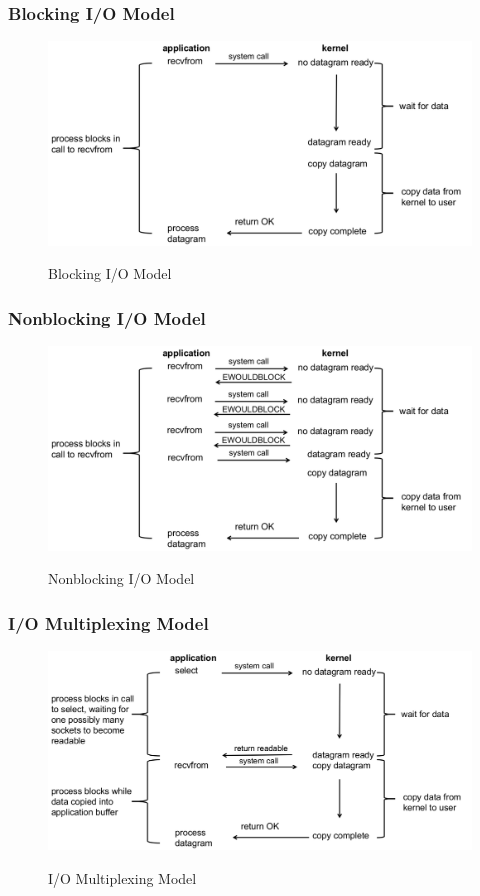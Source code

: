 \documentclass[notes,serif]{beamer}
\begin{document}
\begin{frame}
\frametitle{Blocking I/O Model}
  \begin{figure}
  \centering
  \includegraphics[width=.8\textwidth]{fig/03fig01.png}\\
  \caption{Blocking I/O Model}
  \label{1}
  \end{figure}
\end{frame}

\begin{frame}
\frametitle{Nonblocking I/O Model}
  \begin{figure}
  \centering
  \includegraphics[width=.8\textwidth]{fig/03fig02.png}\\
  \caption{Nonblocking I/O Model}
  \label{2}
  \end{figure}
\end{frame}

\begin{frame}
\frametitle{I/O Multiplexing Model}
  \begin{figure}
  \centering
  \includegraphics[width=.8\textwidth]{fig/03fig03.png}\\
  \caption{I/O Multiplexing Model}
  \label{3}
  \end{figure}
\end{frame}
\end{document}

